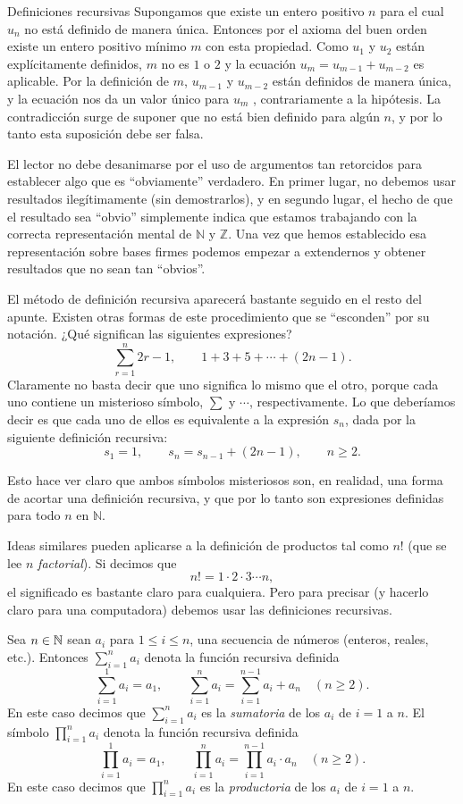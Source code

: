 \begin{section}{Definiciones recursivas}
Supongamos que existe un entero positivo $n$ para el cual $u_n$ no está definido de manera única. Entonces por el axioma del buen orden existe un entero positivo mínimo $m$ con esta propiedad. Como $u_1$ y $u_2$ están explícitamente definidos, $m$ no es $1$ o $2$ y la ecuación $u_m =u_{m-1} +u_{m-2}$ es aplicable. Por la definición de $m$, $u_{m-1}$ y $u_{m-2}$ están definidos de manera única, y la ecuación nos da un valor único para $u_m$ , contrariamente a la hipótesis. La contradicción surge de suponer que no está bien definido para algún $n$, y por lo tanto esta suposición debe ser falsa.

El lector no debe desanimarse por el uso de argumentos tan retorcidos para establecer algo que es ``obviamente'' verdadero. En primer lugar, no debemos usar resultados ilegítimamente (sin demostrarlos), y en segundo lugar, el hecho de que el resultado sea ``obvio'' simplemente indica que estamos trabajando con la correcta representación mental de $\mathbb N$ y $\mathbb Z$. Una vez que hemos establecido esa representación sobre bases firmes podemos empezar a extendernos y obtener resultados que no sean tan ``obvios''.

El método de definición recursiva aparecerá bastante seguido en el resto del apunte. Existen otras formas de este procedimiento que se ``esconden'' por su notación. ¿Qué significan las siguientes expresiones?
$$
\sum_{r=1}^{n} 2r-1,\qquad 1+3+5+\cdots +(2n-1).
$$
Claramente no basta decir que uno significa lo mismo que el otro, porque cada uno contiene un misterioso símbolo, $\sum$ y $\cdots$, respectivamente. Lo que deberíamos decir es que cada uno de ellos es equivalente a la expresión $s_n$, dada por la siguiente definición recursiva:
$$
s_1= 1, \qquad s_n = s_{n-1} +(2n-1), \qquad n\ge 2.
$$

Esto hace ver claro que ambos símbolos misteriosos son, en realidad, una forma de acortar una definición recursiva, y que por lo tanto son expresiones definidas para todo $n$ en $\mathbb N$.

Ideas similares pueden aplicarse a la definición de productos tal como $n!$ (que se lee $n$ \textit{factorial}). Si decimos que
$$
n!=1 \cdot 2 \cdot 3 \cdots n,
$$
el significado es bastante claro para cualquiera. Pero para precisar (y hacerlo claro para una computadora) debemos usar las definiciones recursivas.

\begin{definicion} Sea $n \in {\mathbb N}$ sean $a_i$  para $1 \le i \le n$, una secuencia de números (enteros, reales, etc.). Entonces $\sum_{i=1}^{n} a_i$  denota la función recursiva definida  
    $$
    \sum_{i=1}^{1} a_i= a_1, \qquad \sum_{i=1}^{n} a_i = \sum_{i=1}^{n-1} a_i+ a_{n} \quad (n\ge 2).
    $$
    En  este caso  decimos que  $\sum_{i=1}^{n} a_i$ es la \textit{sumatoria} de los $a_i$ de $i=1$  a $n$. El símbolo $\prod_{i=1}^{n} a_i$ denota la función recursiva definida  
    $$
    \prod_{i=1}^{1} a_i= a_1, \qquad \prod_{i=1}^{n} a_i = \prod_{i=1}^{n-1} a_i \cdot  a_{n} \quad (n\ge 2).
    $$
    En  este caso  decimos que  $\prod_{i=1}^{n} a_i$ es la \textit{productoria} de los $a_i$ de $i=1$  a $n$. 
\end{definicion}




\end{section}
